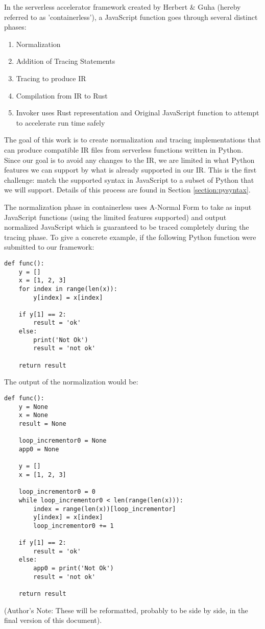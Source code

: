 \documentclass[acmsmall,review,authorversion]{acmart}
\begin{document}
In the serverless accelerator framework created by Herbert \& Guha (hereby referred to as 'containerless'), a JavaScript function goes through several distinct phases:
\begin{enumerate}
    \item Normalization
    \item Addition of Tracing Statements
    \item Tracing to produce IR
    \item Compilation from IR to Rust
    \item Invoker uses Rust representation and Original JavaScript function to attempt to accelerate run time safely
\end{enumerate}
The goal of this work is to create normalization and tracing implementations that can produce compatible IR files from serverless functions written in Python. Since our goal is to avoid any changes to the IR, we are limited in what Python features we can support by what is already supported in our IR. This is the first challenge: match the supported syntax in JavaScript to a subset of Python that we will support. Details of this process are found in Section \ref{section:pysyntax}.
\par
The normalization phase in containerless uses A-Normal Form to take as input JavaScript functions (using the limited features supported) and output normalized JavaScript which is guaranteed to be traced completely during the tracing phase. To give a concrete example, if the following Python function were submitted to our framework:
\begin{verbatim}
def func():
    y = []
    x = [1, 2, 3]
    for index in range(len(x)):
        y[index] = x[index]
        
    if y[1] == 2:
        result = 'ok'
    else:
        print('Not Ok')
        result = 'not ok'
        
    return result
\end{verbatim}
The output of the normalization would be:
\begin{verbatim}
def func():
    y = None
    x = None
    result = None
    
    loop_incrementor0 = None
    app0 = None
    
    y = []
    x = [1, 2, 3]
    
    loop_incrementor0 = 0
    while loop_incrementor0 < len(range(len(x))):
        index = range(len(x))[loop_incrementor]
        y[index] = x[index]
        loop_incrementor0 += 1
        
    if y[1] == 2:
        result = 'ok'
    else:
        app0 = print('Not Ok')
        result = 'not ok'
        
    return result
\end{verbatim}
(Author's Note: These will be reformatted, probably to be side by side, in the final version of this document).
\end{document}
